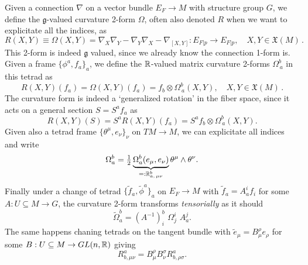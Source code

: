 \documentclass[../geometry_main.tex]{subfiles}
\begin{document}
\begin{mytheorem}
Given a connection $\nabla$ on a vector bundle $E_F\to M$ with structure group $G$, we define the $\mathfrak{g}$-valued curvature 2-form $\Omega$, often also denoted $R$ when we want to explicitate all the indices, as 
\begin{equation}
    R(X,Y) \equiv \Omega(X,Y) =\nabla_X \nabla_Y - \nabla_Y \nabla_X - \nabla_{[X,Y]}: E_{F\vert p} \to E_{F\vert p},\quad X,Y \in \mathfrak{X}(M)\,.
\end{equation}
This 2-form is indeed $\mathfrak{g}$ valued, since we already know the connection 1-form is.
Given a frame $\{\phi^a,f_a\}_a$, we define the $\mathbb{R}$-valued matrix curvature 2-forms $\Omega^b_{\, a}$ in this tetrad as
\begin{equation}
    R(X,Y) (f_a) = \Omega(X,Y) (f_a) = f_b \otimes \Omega^b_{\, a}(X,Y), \quad X,Y \in \mathfrak{X}(M)\,.
\end{equation}
The curvature form is indeed a `generalized rotation' in the fiber space, since it acts on a general section $S=S^a f_a$ as 
\begin{equation}
    R(X,Y) (S) = S^a R(X,Y) (f_a) = S^a f_b \otimes \Omega^b_{\, a}(X,Y).
\end{equation}
Given also a tetrad frame $\{\theta^\mu, e_\nu\}_\nu$ on $TM\to M$, we can explicitate all indices and write
\begin{align}
    \Omega_a^b= \tfrac12\underbrace{\Omega^b_a(e_\mu,e_\nu)}_{=:\mathbb{R}^b_{a,\,\mu\nu}}\theta^\mu \wedge \theta^\nu.
\end{align}
Finally under a change of tetrad $\{\tilde{f}_a,\tilde{\phi}^a\}_a$ on $E_F\to M$ with $\tilde{f}_a= A_a^i f_i$ for some $A: U \subseteq M \to G$, the curvature 2-form transforms \emph{tensorially} as it should
\begin{equation}
    \tilde{\Omega}_a^b= (A^{-1})_i^b \,\, \Omega^i_{j} \,\, A_a^j.
\end{equation}
The same happens chaning tetrads on the tangent bundle with $\tilde{e}_\mu = B_\mu^\rho e_\rho$ for some $B: U \subseteq M \to GL(n,\mathbb{R})$ giving
\begin{equation}
    R^a_{b,\mu\nu}= B_\mu^\rho B_\nu^\sigma R^a_{b,\rho\sigma}.
\end{equation}
\end{mytheorem}
\end{document}
